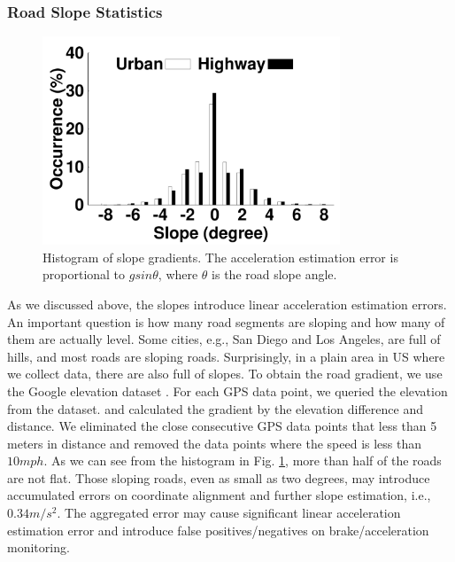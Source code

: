 \subsubsection{Road Slope Statistics}

\begin{figure}[ht]
\begin{center}
\includegraphics[width=3.5in, angle=0]{Figs/DriveSense/slopeaware/degrees.pdf}
\caption{Histogram of slope gradients. The acceleration estimation error is 
proportional to $gsin\theta$, where $\theta$ is the road slope angle.}
\label{slopegradients}
\vspace{-0.4cm}
\end{center}
\end{figure}


As we discussed above, the slopes introduce linear acceleration estimation errors.
An important question is how many road segments are sloping and
how many of them are actually level. 
Some cities, e.g., San Diego and Los Angeles, are full of hills, 
and most roads are sloping roads.
Surprisingly, in a plain area in US where we collect data, 
there are also full of slopes. 
To obtain the road gradient, we use the Google elevation dataset \cite{googleelevation}. 
For each GPS data point, we queried the elevation from the dataset. 
and calculated the gradient by the elevation difference
and distance.
We eliminated the close consecutive GPS data points that less than 5 meters in distance and removed the data points where the speed is less than $10mph$.
As we can see from the histogram in Fig. \ref{slopegradients}, 
more than half of the roads are not flat.
Those sloping roads, even as small as two degrees, may introduce accumulated
errors on coordinate alignment and further slope estimation, i.e., $0.34m/s^2$.
The aggregated error may cause significant linear acceleration estimation error
and introduce false positives/negatives on brake/acceleration monitoring. 




